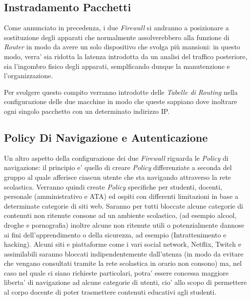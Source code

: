 \documentclass{report}
\begin{document}
        \subsection{Instradamento Pacchetti}
            Come annunciato in precedenza, i due \emph{Firewall} si andranno a posizionare a sostituzione degli apparati
             che normalmente assolverebbero alla funzione di \emph{Router} in modo da avere un solo dispositivo che svolga
             più mansioni: in questo modo, verra' sia ridotta la latenza introdotta da un analisi del traffico posteriore,
             sia l'ingombro fisico degli apparati, semplficando dunque la manutenzione e l'organizzazione.

             Per svolgere questo compito verranno introdotte delle \emph{Tabelle di Routing} nella configurazione delle due
             macchine in modo che queste sappiano dove inoltrare ogni singolo pacchetto con un determinato indirizzo IP.
        \subsection{Policy Di Navigazione e Autenticazione}
            Un altro aspetto della configurazione dei due \emph{Firewall} riguarda le \emph{Policy} di navigazione: il
             principio e' quello di creare \emph{Policy} differenziate a seconda del gruppo al quale afferisce ciascun utente 
             che sta navigando attraverso la rete scolastica. Verranno quindi create \emph{Policy} specifiche per studenti,
             docenti, personale (amministrativo e ATA) ed ospiti con differenti limitazioni in base a determinate categorie
             di siti web. Saranno per tutti bloccate alcune categorie di contenuti non ritenute consone ad un ambiente
             scolastico, (ad esempio alcool, droghe e pornografia) inoltre alcune non ritenute utili o potenzialmente
             dannose ai fini dell'apprendimento o della sicurezza, ad esempio (Intrattenimento e hacking).
             Alcuni siti e piattaforme come i vari social network, Netflix, Twitch e assimilabili saranno bloccati
             indipendentemente dall'utenza (in modo da evitare che vengano consultati tramite la rete scolastica in orario
             non consono) ma, nel caso nel quale ci siano richieste particolari, potra' essere concessa maggiore liberta' di
             navigazione ad alcune categorie di utenti, cio' allo scopo di permettere al corpo docente di poter trasmettere
             contenuti educativi agli studenti.
\end{document}
